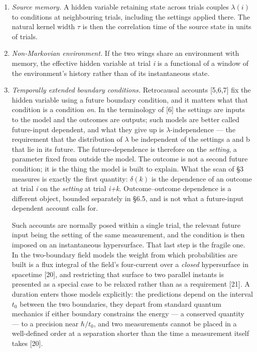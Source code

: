 \documentclass[
  11pt,
]{article}
\begin{document}
\begin{enumerate}
\def\labelenumi{\arabic{enumi}.}
\item
  \emph{Source memory.} A hidden variable retaining state across trials
  couples \(\lambda(i)\) to conditions at neighbouring trials, including
  the settings applied there. The natural kernel width \(\tau\) is then
  the correlation time of the source state in units of trials.
\item
  \emph{Non-Markovian environment.} If the two wings share an
  environment with memory, the effective hidden variable at trial
  \emph{i} is a functional of a window of the environment's history
  rather than of its instantaneous state.
\item
  \emph{Temporally extended boundary conditions.} Retrocausal accounts
  {[}5,6,7{]} fix the hidden variable using a future boundary condition,
  and it matters what that condition is a condition \emph{on}. In the
  terminology of {[}6{]} the settings are inputs to the model and the
  outcomes are outputs; such models are better called future-input
  dependent, and what they give up is \(\lambda\)-independence --- the
  requirement that the distribution of \(\lambda\) be independent of the
  settings a and b that lie in its future. The future-dependence is
  therefore on the \emph{setting}, a parameter fixed from outside the
  model. The outcome is not a second future condition; it is the thing
  the model is built to explain. What the scan of \S3 measures is
  exactly the first quantity: \(\delta(k)\) is the dependence of an
  outcome at trial \emph{i} on the \emph{setting} at trial \emph{i+k}.
  Outcome--outcome dependence is a different object, bounded separately
  in \S6.5, and is not what a future-input dependent account calls for.

  Such accounts are normally posed within a single trial, the relevant
  future input being the setting of the same measurement, and the
  condition is then imposed on an instantaneous hypersurface. That last
  step is the fragile one. In the two-boundary field models the weight
  from which probabilities are built is a flux integral of the field's
  four-current over a \emph{closed} hypersurface in spacetime {[}20{]},
  and restricting that surface to two parallel instants is presented as
  a special case to be relaxed rather than as a requirement {[}21{]}. A
  duration enters those models explicitly: the predictions depend on the
  interval \(t_{0}\) between the two boundaries, they depart from
  standard quantum mechanics if either boundary constrains the energy
  --- a conserved quantity --- to a precision near \(\hbar/t_0\), and
  two measurements cannot be placed in a well-defined order at a
  separation shorter than the time a measurement itself takes {[}20{]}.


\end{enumerate}
\end{document}
